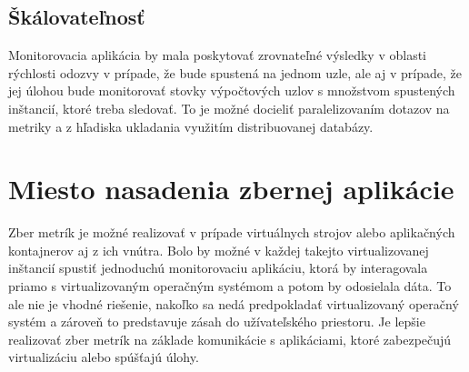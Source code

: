 \documentclass[printed,11pt,twoside,color,cover,table]{fithesis3}
\begin{document}
\subsection{Škálovateľnosť}
Monitorovacia aplikácia by mala poskytovať zrovnateľné výsledky v oblasti rýchlosti odozvy v prípade, že bude spustená na jednom uzle, ale aj v prípade, že jej úlohou bude monitorovať stovky 
výpočtových uzlov s množstvom spustených inštancií, ktoré treba sledovať. To je možné docieliť paralelizovaním dotazov na metriky a z hľadiska ukladania využitím distribuovanej databázy.

\section{Miesto nasadenia zbernej aplikácie}
Zber metrík je možné realizovať v prípade virtuálnych strojov alebo aplikačných kontajnerov aj z ich vnútra. Bolo by možné v každej
takejto virtualizovanej inštancií spustiť jednoduchú monitorovaciu aplikáciu, ktorá by interagovala priamo s virtualizovaným operačným systémom a potom by odosielala dáta.
To ale nie je vhodné riešenie, nakoľko sa nedá predpokladať virtualizovaný operačný systém a zároveň to predstavuje zásah do užívateľského
priestoru. Je lepšie realizovať zber metrík na základe komunikácie s aplikáciami, ktoré zabezpečujú virtualizáciu alebo spúšťajú úlohy.
\end{document}
